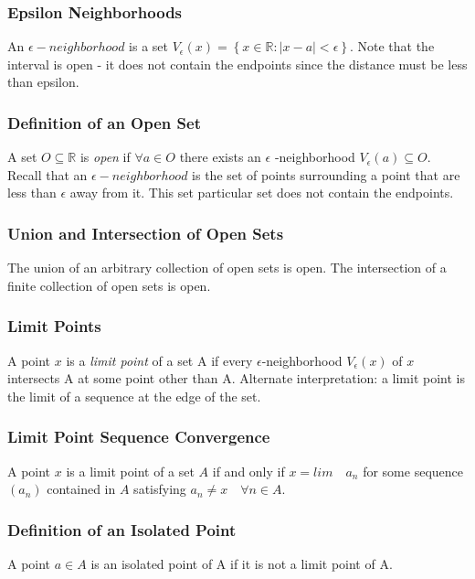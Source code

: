 \documentclass{article}
\begin{document}
\subsubsection{Epsilon Neighborhoods}

An $ \epsilon -neighborhood $ is a set \( V_{\epsilon} (x) = \left \{ x \in \mathbb{R} : | x- a | < \epsilon \right \} \). Note that the interval is open - it does not contain the endpoints since the distance must be less than epsilon.

\subsubsection{Definition of an Open Set}

A set \( O \subseteq \mathbb{R} \) is \textit{open} if \( \forall a \in O \) there exists an $ \epsilon $ -neighborhood \( V_{\epsilon} (a) \subseteq O \). Recall that an $\epsilon - neighborhood$ is the set of points surrounding a point that are less than $ \epsilon $ away from it. This set particular set does not contain the endpoints. 

\subsubsection{Union and Intersection of Open Sets}

The union of an arbitrary collection of open sets is open. The intersection of a finite collection of open sets is open. 

\subsubsection{Limit Points}

A point $x$ is a \textit{limit point} of a set A if every $ \epsilon$-neighborhood  $V_{\epsilon}(x)$ of $x$ intersects A at some point other than A.  Alternate interpretation: a limit point is the limit of a sequence at the edge of the set.

\subsubsection{Limit Point Sequence Convergence}

A point $x$ is a limit point of a set $A$ if and only if $x=lim \quad a_n $ for some sequence $ (a_n) $ contained in $A$ satisfying \(a_n \neq x \quad \forall n \in A \).

\subsubsection{Definition of an Isolated Point}
A point $ a \in A $ is an isolated point of A if it is not a limit point of A.
\end{document}
